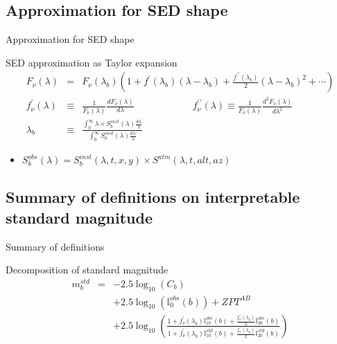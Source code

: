\documentclass{beamer}
\begin{document}
\subsection{Approximation for SED shape}
\begin{frame}{Approximation for SED shape} 
\begin{exampleblock}{SED approximation as Taylor expansion}
\begin{eqnarray}
F_\nu(\lambda) & = & F_\nu(\lambda_b) \left(1 + f^\prime(\lambda_b)(\lambda-\lambda_b) + \frac{f^{\prime\prime}(\lambda_b)}{2}(\lambda-\lambda_b)^2 + \cdots \right) \\
f_\nu^\prime(\lambda) & \equiv & \frac{1}{F_\nu(\lambda)}\frac{dF_\nu(\lambda)}{d\lambda} \qquad \qquad \qquad
f_\nu^{\prime\prime}(\lambda)  \equiv  \frac{1}{F_\nu(\lambda)}\frac{d^2F_\nu(\lambda)}{d\lambda^2} \nonumber \\
\lambda_b & \equiv & \frac{\int_0^{\infty} \lambda \times S_b^{inst}(\lambda) \frac{d\lambda}{\lambda}}
{\int_0^{\infty} S_b^{inst}(\lambda) \frac{d\lambda}{\lambda}}
\end{eqnarray}
\begin{itemize}
\item $S_b^{obs}(\lambda) = S_b^{inst}(\lambda,t,x,y) \times S^{atm}(\lambda,t,alt,az)$
\end{itemize}
\end{exampleblock}
\end{frame}

\subsection{Summary of definitions on interpretable standard magnitude}
\begin{frame}{Summary of definitions}
\begin{alertblock}{Decomposition of standard magnitude}
\begin{eqnarray}
m_b^{std} & = & -2.5 \log_{10}(C_b)  \nonumber \\
          &   &  + 2.5 \log_{10}(\mathbb{I}_0^{obs}(b)) + ZPT^{AB}  \nonumber \\
          &   &  + 2.5 \log_{10}\left( 
\frac{1 + f_\nu^\prime(\lambda_b)\mathbb{I}^{obs}_{10}(b)  +\frac{f_\nu^{\prime\prime}(\lambda_b)}{2}\mathbb{I}_{20}^{obs}(b)}
{1 + f_\nu^\prime(\lambda_b)\mathbb{I}^{std}_{10}(b)  +\frac{f_\nu^{\prime\prime}(\lambda_b)}{2}\mathbb{I}_{20}^{std}(b)}\right)
\end{eqnarray}
\end{alertblock}
\end{frame}
\end{document}

